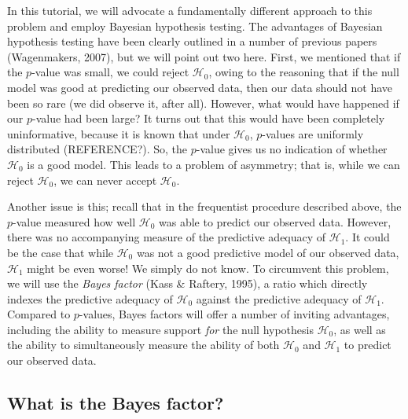 \documentclass[english,,doc,floatsintext]{apa6}
\begin{document}
In this tutorial, we will advocate a fundamentally different approach to this problem and employ Bayesian hypothesis testing. The advantages of Bayesian hypothesis testing have been clearly outlined in a number of previous papers (Wagenmakers, 2007), but we will point out two here. First, we mentioned that if the \(p\)-value was small, we could reject \(\mathcal{H}_0\), owing to the reasoning that if the null model was good at predicting our observed data, then our data should not have been so rare (we did observe it, after all). However, what would have happened if our \(p\)-value had been large? It turns out that this would have been completely uninformative, because it is known that under \(\mathcal{H}_0\), \(p\)-values are uniformly distributed (REFERENCE?). So, the \(p\)-value gives us no indication of whether \(\mathcal{H}_0\) is a good model. This leads to a problem of asymmetry; that is, while we can reject \(\mathcal{H}_0\), we can never accept \(\mathcal{H}_0\).

Another issue is this; recall that in the frequentist procedure described above, the \(p\)-value measured how well \(\mathcal{H}_0\) was able to predict our observed data. However, there was no accompanying measure of the predictive adequacy of \(\mathcal{H}_1\). It could be the case that while \(\mathcal{H}_0\) was not a good predictive model of our observed data, \(\mathcal{H}_1\) might be even worse! We simply do not know. To circumvent this problem, we will use the \emph{Bayes factor} (Kass \& Raftery, 1995), a ratio which directly indexes the predictive adequacy of \(\mathcal{H}_0\) against the predictive adequacy of \(\mathcal{H}_1\). Compared to \(p\)-values, Bayes factors will offer a number of inviting advantages, including the ability to measure support \emph{for} the null hypothesis \(\mathcal{H}_0\), as well as the ability to simultaneously measure the ability of both \(\mathcal{H}_0\) and \(\mathcal{H}_1\) to predict our observed data.

\hypertarget{what-is-the-bayes-factor}{%
\subsection{What is the Bayes factor?}\label{what-is-the-bayes-factor}}
\end{document}

